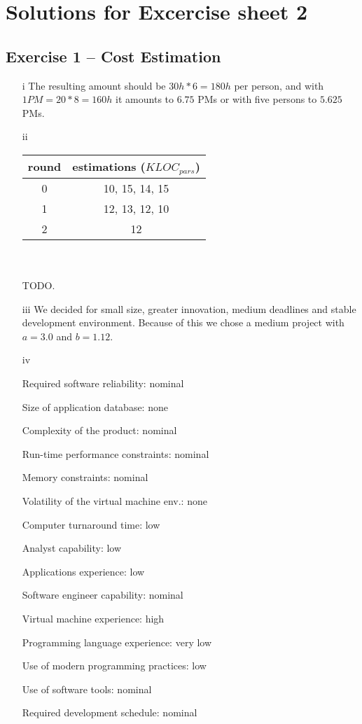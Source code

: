 \documentclass{scrartcl}
\begin{document}
\section*{Solutions for Excercise sheet 2}

\subsection*{Exercise 1 – Cost Estimation}
\begin{itemize}
	\item[i]
	The resulting amount should be $30h*6=180h$ per person, and with $1 PM=20*8=160h$ it amounts to $6.75$ PMs or with five persons to $5.625$ PMs.\\
	\item[ii]
	\begin{tabular} {| c | c |}
		round & estimations ($KLOC_{pars}$)\\
		\hline
		0 & 10, 15, 14, 15 \\
		1 & 12, 13, 12, 10\\
		2 & 12\\
	\end{tabular}\\\\
	TODO. \\
	\item[iii]
	We decided for small size, greater innovation, medium deadlines and stable development environment. Because of this we chose a medium project with $a=3.0$ and $b=1.12$.\\
	\item[iv]

		\item[]Required software reliability: nominal
		\item[]Size of application database:  none
		\item[]Complexity of the product:  nominal
		\item[]Run-time performance constraints:   nominal
		\item[]Memory constraints:  nominal
		\item[]Volatility of the virtual machine env.:  none
		\item[]Computer turnaround time:  low
		\item[]Analyst capability:  low
		\item[]Applications experience:  low
		\item[]Software engineer capability:  nominal
		\item[]Virtual machine experience:  high
		\item[]Programming language experience:  very low
		\item[]Use of modern programming practices:  low
		\item[]Use of software tools:  nominal
		\item[]Required development schedule:  nominal



\end{itemize}
\end{document}
